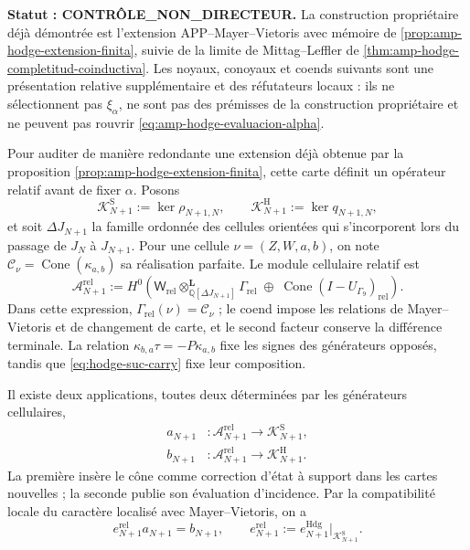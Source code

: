 \noindent\textbf{Statut : CONTRÔLE\_NON\_DIRECTEUR.}
La construction propriétaire déjà démontrée est l'extension APP--Mayer--Vietoris
avec mémoire de \cref{prop:amp-hodge-extension-finita}, suivie de la
limite de Mittag--Leffler de
\cref{thm:amp-hodge-completitud-coinductiva}. Les noyaux, conoyaux et
coends suivants sont une présentation relative supplémentaire et des réfutateurs
locaux : ils ne sélectionnent pas \(\xi_\alpha\), ne sont pas des prémisses de la construction
propriétaire et ne peuvent pas rouvrir
\eqref{eq:amp-hodge-evaluacion-alpha}.

Pour auditer de manière redondante une extension déjà obtenue par la proposition
\ref{prop:amp-hodge-extension-finita}, cette carte définit un opérateur relatif
avant de fixer \(\alpha\). Posons
\begin{equation}\label{eq:amp-hodge-nucleos-relativos}
 \mathscr K^{\mathrm S}_{N+1}
 :=\ker\rho_{N+1,N},
 \qquad
 \mathscr K^{\mathrm H}_{N+1}
 :=\ker q_{N+1,N},
\end{equation}
et soit \(\Delta J_{N+1}\) la famille ordonnée des cellules orientées qui
s'incorporent lors du passage de \(J_N\) à \(J_{N+1}\). Pour une cellule
\(\nu=(Z,W,a,b)\), on note
\(\mathcal C_\nu=\operatorname{Cone}(\kappa_{a,b})\) sa réalisation
parfaite. Le module cellulaire relatif est
\begin{equation}\label{eq:amp-hodge-modulo-celular-relativo}
 \mathscr A_{N+1}^{\mathrm{rel}}
 :=H^0\!\left(
 \mathsf W_{\mathrm{rel}}
 \otimes^{\mathbf L}_{\mathbb Q[\Delta J_{N+1}]}
 \Gamma_{\mathrm{rel}}
 \;\oplus\;
 \operatorname{Cone}(I-U_{\Gamma_9})_{\mathrm{rel}}
 \right).
\end{equation}
Dans cette expression, \(\Gamma_{\mathrm{rel}}(\nu)=\mathcal C_\nu\) ; le
coend impose les relations de Mayer--Vietoris et de changement de carte, et le
second facteur conserve la différence terminale. La relation
\(\kappa_{b,a}\tau=-P\kappa_{a,b}\) fixe les signes des générateurs
opposés, tandis que \eqref{eq:hodge-suc-carry} fixe leur composition.

Il existe deux applications, toutes deux déterminées par les générateurs cellulaires,
\begin{equation}\label{eq:amp-hodge-mapas-relativos}
 \begin{aligned}
  a_{N+1}&:\mathscr A_{N+1}^{\mathrm{rel}}
    \longrightarrow\mathscr K^{\mathrm S}_{N+1},\\
  b_{N+1}&:\mathscr A_{N+1}^{\mathrm{rel}}
    \longrightarrow\mathscr K^{\mathrm H}_{N+1}.
 \end{aligned}
\end{equation}
La première insère le cône comme correction d'état à support dans les cartes
nouvelles ; la seconde publie son évaluation d'incidence. Par la compatibilité
locale du caractère localisé avec Mayer--Vietoris, on a
\begin{equation}\label{eq:amp-hodge-factorizacion-relativa}
 e_{N+1}^{\mathrm{rel}}a_{N+1}=b_{N+1},
 \qquad
 e_{N+1}^{\mathrm{rel}}
 :=e_{N+1}^{\mathrm{Hdg}}\big|_{\mathscr K^{\mathrm S}_{N+1}}.
\end{equation}

